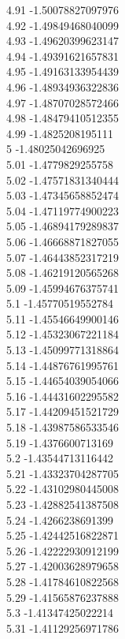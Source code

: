 {4.91	-1.50078827097976\\
4.92	-1.49849468040099\\
4.93	-1.49620399623147\\
4.94	-1.49391621657831\\
4.95	-1.49163133954439\\
4.96	-1.48934936322836\\
4.97	-1.48707028572466\\
4.98	-1.48479410512355\\
4.99	-1.4825208195111\\
5	-1.48025042696925\\
5.01	-1.4779829255758\\
5.02	-1.47571831340444\\
5.03	-1.47345658852474\\
5.04	-1.47119774900223\\
5.05	-1.46894179289837\\
5.06	-1.46668871827055\\
5.07	-1.46443852317219\\
5.08	-1.46219120565268\\
5.09	-1.45994676375741\\
5.1	-1.45770519552784\\
5.11	-1.45546649900146\\
5.12	-1.45323067221184\\
5.13	-1.45099771318864\\
5.14	-1.44876761995761\\
5.15	-1.44654039054066\\
5.16	-1.44431602295582\\
5.17	-1.44209451521729\\
5.18	-1.43987586533546\\
5.19	-1.4376600713169\\
5.2	-1.43544713116442\\
5.21	-1.43323704287705\\
5.22	-1.43102980445008\\
5.23	-1.42882541387508\\
5.24	-1.4266238691399\\
5.25	-1.42442516822871\\
5.26	-1.42222930912199\\
5.27	-1.42003628979658\\
5.28	-1.41784610822568\\
5.29	-1.41565876237888\\
5.3	-1.41347425022214\\
5.31	-1.41129256971786\\
}
